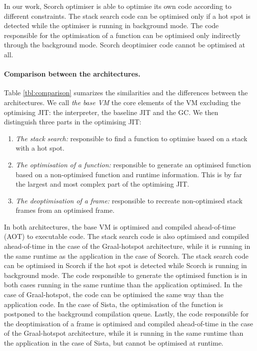 \documentclass[a4paper,12pt,twoside]{../includes/ThesisStyle}
\begin{document}
In our work, Scorch optimiser is able to optimise its own code according to different constraints. The stack search code can be optimised only if a hot spot is detected while the optimiser is running in background mode. The code responsible for the optimisation of a function can be optimised only indirectly through the background mode. Scorch deoptimiser code cannot be optimised at all. 

\paragraph{Comparison between the architectures.}Table \ref{tbl:comparison} sumarizes the similarities and the differences between the architectures. We call \emph{the base VM} the core elements of the VM excluding the optimising JIT: the interpreter, the baseline JIT and the GC. We then distinguish three parts in the optimising JIT:
\begin{enumerate}
	\item \emph{The stack search:} responsible to find a function to optimise based on a stack with a hot spot.
	\item \emph{The optimisation of a function:} responsible to generate an optimised function based on a non-optimised function and runtime information. This is by far the largest and most complex part of the optimising JIT.
	\item \emph{The deoptimisation of a frame:} responsible to recreate non-optimised stack frames from an optimised frame. 
\end{enumerate}
In both architectures, the base VM is optimised and compiled ahead-of-time (AOT) to executable code. The stack search code is also optimised and compiled ahead-of-time in the case of the Graal-hotspot architecture, while it is running in the same runtime as the application in the case of Scorch. The stack search code can be optimised in Scorch if the hot spot is detected while Scorch is running in background mode. The code responsible to generate the optimised function is in both cases running in the same runtime than the application optimised. In the case of Graal-hotspot, the code can be optimised the same way than the application code. In the case of Sista, the optimisation of the function is postponed to the background compilation queue. Lastly, the code responsible for the deoptimisation of a frame is optimised and compiled ahead-of-time in the case of the Graal-hotspot architecture, while it is running in the same runtime than the application in the case of Sista, but cannot be optimised at runtime.
\end{document}
